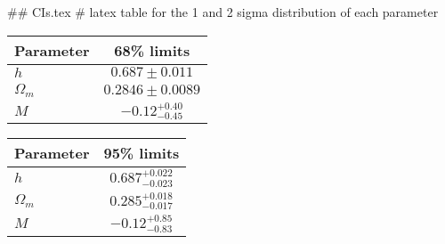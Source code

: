 ## CIs.tex
# latex table for the 1 and 2 sigma distribution of each parameter

\begin{tabular} { l  c}
 Parameter &  68\% limits\\
\hline
{\boldmath$h              $} & $0.687\pm 0.011            $\\
{\boldmath$\Omega_m       $} & $0.2846\pm 0.0089          $\\
{\boldmath$M              $} & $-0.12^{+0.40}_{-0.45}     $\\
\hline
\end{tabular}

\begin{tabular} { l  c}
 Parameter &  95\% limits\\
\hline
{\boldmath$h              $} & $0.687^{+0.022}_{-0.023}   $\\
{\boldmath$\Omega_m       $} & $0.285^{+0.018}_{-0.017}   $\\
{\boldmath$M              $} & $-0.12^{+0.85}_{-0.83}     $\\
\hline
\end{tabular}
